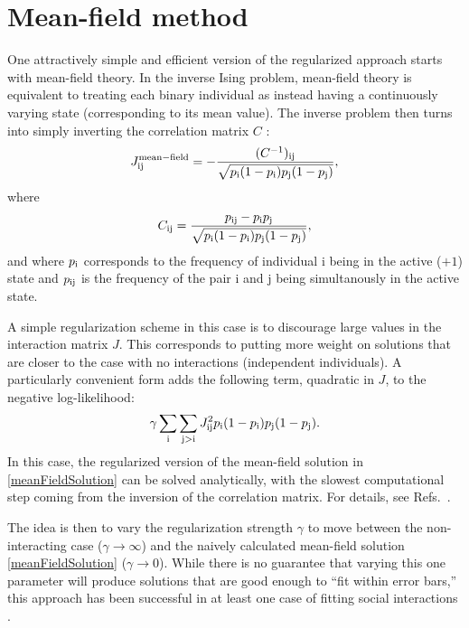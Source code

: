 \documentclass[aps,prl,twocolumn,nofootinbib]{revtex4-1}
\begin{document}
\section{Mean-field method}
One attractively simple and efficient version of the regularized approach starts
with mean-field theory.  In the inverse Ising problem, mean-field theory is equivalent
to treating each binary individual as instead having a continuously varying state
(corresponding to its mean value).  The inverse problem then turns into simply inverting
the correlation matrix $C$ \cite{CocMon12}:
\begin{equation}
\label{meanFieldSolution}
J^{\mathrm{mean-field}}_{\rm ij} =
    - \frac{ (C^{-1})_{\rm ij} }{ \sqrt{p_{\rm i}(1-p_{\rm i})p_{\rm j}(1-p_{\rm j})} },
\end{equation}
where
\begin{equation}
C_{\rm ij} = \frac{ p_{\rm ij} - p_{\rm i} p_{\rm j} }{ \sqrt{p_{\rm i}(1-p_{\rm i})p_{\rm j}(1-p_{\rm j})} },
\end{equation}
and where $p_{\rm i}$ corresponds to the frequency of individual i being
in the active ($+1$) state and $p_{\rm ij}$ is the frequency of the pair
i and j being simultanously in the active state.

A simple regularization scheme in this case is to discourage large values in the interaction
matrix $J$.  This corresponds to putting more weight on solutions that are closer to
the case with no interactions (independent individuals).  A particularly convenient form
adds the following term, quadratic in $J$, to the negative log-likelihood:
\begin{equation}
\gamma \sum_{\rm i} \sum_{\rm j > i} J_{\rm ij}^2 p_{\rm i} (1-p_{\rm i}) p_{\rm j} (1-p_{\rm j}).
\end{equation}
In this case, the regularized version of the mean-field solution in \eqref{meanFieldSolution}
can be solved analytically, with the slowest computational step coming from the inversion
of the correlation matrix.  For details, see Refs.~\cite{Daniels:1cq,BarCoc13}.

The idea is then to vary the regularization strength $\gamma$ to move between the
non-interacting case ($\gamma \rightarrow \infty$) and the naively calculated
mean-field solution \eqref{meanFieldSolution} ($\gamma \rightarrow 0$).
While there is no guarantee that varying this one parameter will produce solutions that are
good enough to ``fit within error bars,'' this approach has been successful in at least
one case of fitting social interactions \cite{Daniels:1cq}.
\end{document}

